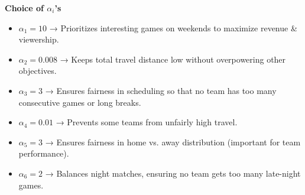 \documentclass[a4paper, 12pt]{article}
\begin{document}
\vspace{15pt}
\textbf{Choice of $\alpha_i$'s}
\begin{itemize}
    \item \(\alpha_1 = 10\) → Prioritizes interesting games on weekends to maximize revenue \& viewership.
    \item \(\alpha_2 = 0.008\) → Keeps total travel distance low without overpowering other objectives.
    \item \(\alpha_3 = 3\) → Ensures fairness in scheduling so that no team has too many consecutive games or long breaks.
    \item \(\alpha_4 = 0.01\) → Prevents some teams from unfairly high travel.
    \item \(\alpha_5 = 3\) → Ensures fairness in home vs. away distribution (important for team performance).
    \item \(\alpha_6 = 2\) → Balances night matches, ensuring no team gets too many late-night games.
\end{itemize}
\end{document}

